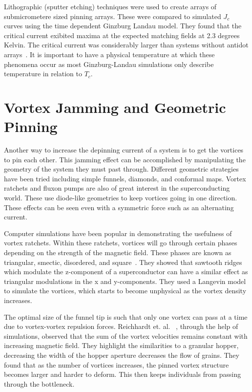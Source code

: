Lithographic (sputter etching) techniques were used to create arrays of submicrometere sized pinning arrays. These were compared to simulated $J_c$ curves using the time dependent Ginzburg Landau model. They found that the critical current exibited maxima at the expected matching fields at 2.3 degrees Kelvin. The critical current was considerably larger than systems without antidot arrays~\cite{Sabatino10}.
It is important to have a physical temperature at which these phenomena occur as most Ginzburg-Landau simulations only describe temperature in relation to $T_c$.

\section{Vortex Jamming and Geometric Pinning}
Another way to increase the depinning current of a system is to get the vortices to pin each other. This jamming effect can be accomplished by manipulating the geometry of the system they must past through. Different geometric strategies have been tried including simple funnels, diamonds, and conformal maps. Vortex ratchets and fluxon pumps are also of great interest in the superconducting world. These use diode-like geometries to keep vortices going in one direction. These effects can be seen even with a symmetric force such as an alternating current.  

Computer simulations have been popular in demonstrating the usefulness of vortex ratchets. Within these ratchets, vortices will go through certain phases depending on the strength of the magnetic field. These phases are known as triangular, smectic, disordered, and square~\cite{Lu06}. They showed that sawtooth ridges which modulate the z-component of a superconductor can have a similar effect as triangular modulations in the x and y-components. They used a Langevin model to simulate the vortices, which starts to become unphysical as the vortex density increases.  

The optimal size of the funnel tip is such that only one vortex can pass at a time due to vortex-vortex repulsion forces. Reichhardt et. al.~\cite{Reichhardt10} , through the help of simulations, observed that the sum of the vortex velocities remains constant with increasing magnetic field. They highlight the similarities to a granular hopper, decreasing the width of the hopper aperture decreases the flow of grains. They found that as the number of vortices increases, the pinned vortex structure becomes larger and harder to deform. This then keeps individuals from passing through the bottleneck.


